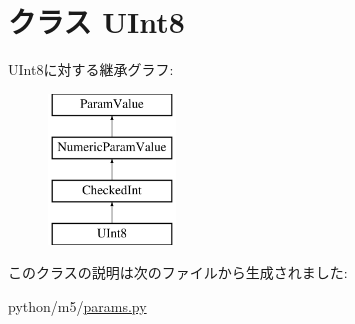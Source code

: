 \hypertarget{classm5_1_1params_1_1UInt8}{
\section{クラス UInt8}
\label{classm5_1_1params_1_1UInt8}
}
UInt8に対する継承グラフ:\begin{figure}[H]
\begin{center}
\leavevmode
\includegraphics[height=4cm]{classm5_1_1params_1_1UInt8}
\end{center}
\end{figure}


このクラスの説明は次のファイルから生成されました:\begin{DoxyCompactItemize}
\item 
python/m5/\hyperlink{params_8py}{params.py}\end{DoxyCompactItemize}
